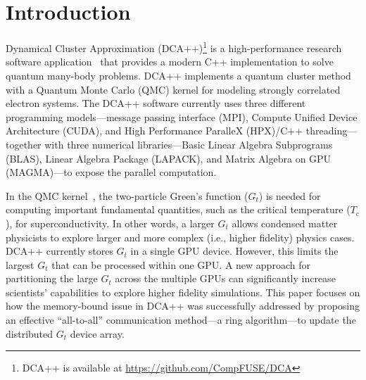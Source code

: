 \section{Introduction}
\label{sec:intro}

Dynamical Cluster Approximation (DCA++)\footnote{DCA++ is available at \url{https://github.com/CompFUSE/DCA}} is a high-performance research software 
application~\cite{PhysRevB.58.R7475, PhysRevB.61.12739, RevModPhys.77.1027, dca_hpx_2020} that provides a modern
C++ implementation to solve quantum many-body problems. 
DCA++ implements a quantum cluster method with a
Quantum Monte Carlo (QMC) kernel for modeling strongly
correlated electron systems. 
The DCA++ software currently uses three different
programming models---message passing interface (MPI), Compute Unified Device Architecture (CUDA), and High Performance ParalleX (HPX)/C++ threading---together with three numerical libraries---Basic Linear Algebra Subprograms (BLAS), Linear Algebra Package (LAPACK),
and Matrix Algebra on GPU (MAGMA)---to expose the parallel computation. 

In the QMC kernel~\cite{dca2019}, the two-particle Green's function ($G_t$) 
is needed for computing important fundamental quantities, such as
the critical temperature ($T_c$), for superconductivity. 
%
In other words, a larger $G_t$ allows condensed matter
physicists to explore larger and more complex (i.e., higher fidelity)
physics cases.
%
DCA++ currently stores $G_t$  in a single GPU device.
%
However, this limits the largest $G_t$ that can be processed within one
GPU.
%
A new approach for partitioning the large $G_t$ across 
the multiple GPUs can significantly increase 
scientists' capabilities to explore higher fidelity simulations.
%
This paper focuses on how the memory-bound issue in DCA++ was successfully addressed by proposing an effective ``all-to-all'' communication
method---a ring algorithm---to update the distributed $G_t$ device array.
